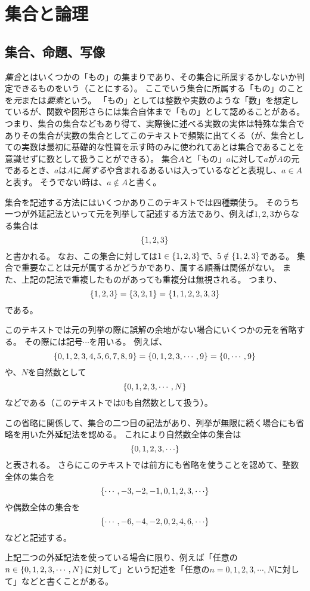 
\chapter{集合と論理}

\section{集合、命題、写像}

\emph{集合}とはいくつかの「もの」の集まりであり、その集合に所属するかしないか判定できるものをいう（ことにする）。
ここでいう集合に所属する「もの」のことを\emph{元}または\emph{要素}という。
「もの」としては整数や実数のような「数」を想定しているが、関数や図形さらには集合自体まで「もの」として認めることがある。
つまり、集合の集合などもあり得て、実際後に述べる実数の実体は特殊な集合でありその集合が実数の集合としてこのテキストで頻繁に出てくる（が、集合としての実数は最初に基礎的な性質を示す時のみに使われてあとは集合であることを意識せずに数として扱うことができる）。
集合$A$と「もの」$a$に対して$a$が$A$の元であるとき、$a$は$A$に\emph{属する}や含まれるあるいは入っているなどと表現し、$a \in A$と表す。
そうでない時は、$a \notin A$と書く。

集合を記述する方法にはいくつかありこのテキストでは四種類使う。
そのうち一つが外延記法といって元を列挙して記述する方法であり、例えば$1, 2, 3$からなる集合は
$$
\{ 1, 2, 3 \}
$$
と書かれる。
なお、この集合に対しては$1 \in \{ 1, 2, 3 \}$で、$5 \notin \{ 1, 2, 3 \}$である。
集合で重要なことは元が属するかどうかであり、属する順番は関係がない。
また、上記の記法で重複したものがあっても重複分は無視される。
つまり、
$$
\{ 1, 2, 3 \} = \{ 3, 2, 1 \} = \{ 1, 1, 2, 2, 3, 3 \}
$$
である。

このテキストでは元の列挙の際に誤解の余地がない場合にいくつかの元を省略する。
その際には記号$\cdots$を用いる。
例えば、
$$
\{ 0, 1, 2, 3, 4, 5, 6, 7, 8, 9 \} = \{ 0, 1, 2, 3, \cdots, 9 \} = \{ 0, \cdots, 9 \}
$$
や、$N$を自然数として
$$
\{ 0, 1, 2, 3, \cdots, N \}
$$
などである（このテキストでは$0$も自然数として扱う）。

この省略に関係して、集合の二つ目の記法があり、列挙が無限に続く場合にも省略を用いた外延記法を認める。
これにより自然数全体の集合は
$$
\lrset{ 0, 1, 2, 3, \cdots }
$$
と表される。
さらにこのテキストでは前方にも省略を使うことを認めて、整数全体の集合を
$$
\lrset{ \cdots, -3, -2, -1, 0, 1, 2, 3, \cdots }
$$
や偶数全体の集合を
$$
\lrset{ \cdots, -6, -4, -2, 0, 2, 4, 6, \cdots }
$$
などと記述する。

上記二つの外延記法を使っている場合に限り、例えば「任意の$n \in \{ 0, 1, 2, 3, \cdots, N \}$に対して」という記述を「任意の$n = 0, 1, 2, 3, \cdots, N$に対して」などと書くことがある。

